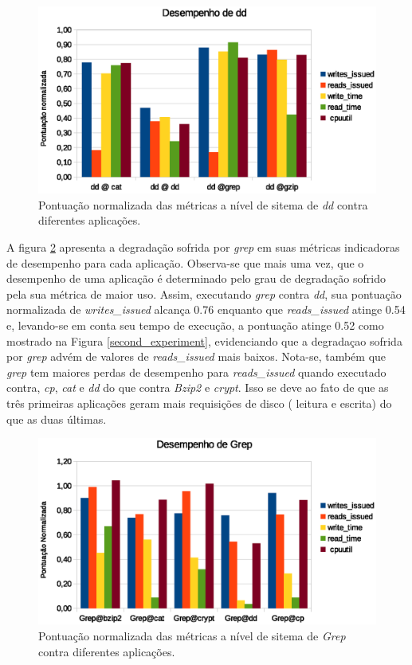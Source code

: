 \begin{figure}[H]
\centering
\includegraphics [keepaspectratio=true,scale=0.7]{graficos/dd_performance.eps}
\caption{Pontuação normalizada das métricas a nível de sitema de \textit{dd} contra diferentes aplicações.}
\label{dd_performance}
\end{figure}  


A figura \ref{grep_performance} apresenta a degradação sofrida por \textit{grep} em suas métricas indicadoras de desempenho para cada aplicação. Observa-se que mais uma vez, que o desempenho de uma aplicação é determinado pelo grau de degradação sofrido pela sua métrica de maior uso. Assim, executando \textit{grep} contra \textit{dd}, sua pontuação normalizada de \textit{writes\_issued} alcança 0.76 enquanto que \textit{reads\_issued} atinge 0.54 e, levando-se em conta seu tempo de execução, a pontuação atinge 0.52 como mostrado na Figura \ref{second_experiment}, evidenciando que a degradaçao sofrida por \textit{grep} advém de valores de \textit{reads\_issued} mais baixos. Nota-se, também que \textit{grep} tem maiores perdas de desempenho para \textit{reads\_issued} quando executado contra, \textit{cp}, \textit{cat} e \textit{dd} do que contra \textit{Bzip2} e \textit{crypt}. Isso se deve ao fato de que as três primeiras aplicações geram mais requisições de disco ( leitura e escrita) do que as duas últimas.

\begin{figure}[H]
\centering
\includegraphics [keepaspectratio=true,scale=0.8]{graficos/grep_performance.eps}
\caption{Pontuação normalizada das métricas a nível de sitema de \textit{Grep} contra diferentes aplicações.}
\label{grep_performance}
\end{figure}   

